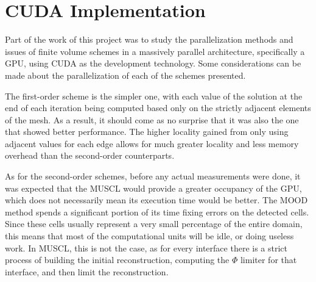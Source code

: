 \section{CUDA Implementation}
\label{sec:600}

Part of the work of this project was to study the parallelization methods and issues of finite volume schemes in a massively parallel architecture, specifically a GPU, using CUDA as the development technology. Some considerations can be made about the parallelization of each of the schemes presented.

The first-order scheme is the simpler one, with each value of the solution at the end of each iteration being computed based only on the strictly adjacent elements of the mesh. As a result, it should come as no surprise that it was also the one that showed better performance. The higher locality gained from only using adjacent values for each edge allows for much greater locality and less memory overhead than the second-order counterparts.

As for the second-order schemes, before any actual measurements were done, it was expected that the MUSCL would provide a greater occupancy of the GPU, which does not necessarily mean its execution time would be better. The MOOD method spends a significant portion of its time fixing errors on the detected cells. Since these cells usually represent a very small percentage of the entire domain, this means that most of the computational units will be idle, or doing useless work. In MUSCL, this is not the case, as for every interface there is a strict process of building the initial reconstruction, computing the $\Phi$ limiter for that interface, and then limit the reconstruction.